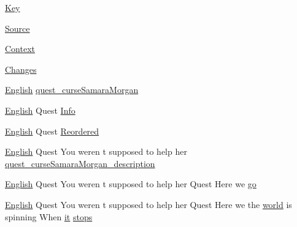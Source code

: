 \begin{DoxyCompactItemize}
\item 
\mbox{\hyperlink{_the_01_restless_01_curse_2_config_2_localization_01-_01_quest_8txt_ab3c7af4820830f9166ede9e5623c4e73}{Key}}
\item 
\mbox{\hyperlink{_the_01_restless_01_curse_2_config_2_localization_01-_01_quest_8txt_a176e1eca2d1e3d1c6a064340bc6a351e}{Source}}
\item 
\mbox{\hyperlink{_the_01_restless_01_curse_2_config_2_localization_01-_01_quest_8txt_abbebfae2c8b3c06e3115e79965277840}{Context}}
\item 
\mbox{\hyperlink{_the_01_restless_01_curse_2_config_2_localization_01-_01_quest_8txt_aada75e543d2eadaa69533d17cac8bd9a}{Changes}}
\item 
\mbox{\hyperlink{_sphere_i_i_01_winter_01_project_2_config_2_localization_8txt_ad896b63205779b1b09e86d941ce13976}{English}} \mbox{\hyperlink{_the_01_restless_01_curse_2_config_2_localization_01-_01_quest_8txt_aa5852d37d4ce0ab8ea2caa15bd175566}{quest\+\_\+curse\+Samara\+Morgan}}
\item 
\mbox{\hyperlink{_sphere_i_i_01_winter_01_project_2_config_2_localization_8txt_ad896b63205779b1b09e86d941ce13976}{English}} Quest \mbox{\hyperlink{_the_01_restless_01_curse_2_config_2_localization_01-_01_quest_8txt_abb68e52d696d925afb927a05387d9ea2}{Info}}
\item 
\mbox{\hyperlink{_sphere_i_i_01_winter_01_project_2_config_2_localization_8txt_ad896b63205779b1b09e86d941ce13976}{English}} Quest \mbox{\hyperlink{_the_01_restless_01_curse_2_config_2_localization_01-_01_quest_8txt_ad8764ed6c4f3231b4fa4631a45680a42}{Reordered}}
\item 
\mbox{\hyperlink{_sphere_i_i_01_winter_01_project_2_config_2_localization_8txt_ad896b63205779b1b09e86d941ce13976}{English}} Quest You weren t supposed to help her \mbox{\hyperlink{_the_01_restless_01_curse_2_config_2_localization_01-_01_quest_8txt_a7d6c124c385a41af5a0664c7a53e8c3c}{quest\+\_\+curse\+Samara\+Morgan\+\_\+description}}
\item 
\mbox{\hyperlink{_sphere_i_i_01_winter_01_project_2_config_2_localization_8txt_ad896b63205779b1b09e86d941ce13976}{English}} Quest You weren t supposed to help her Quest Here we \mbox{\hyperlink{_the_01_restless_01_curse_2_config_2_localization_01-_01_quest_8txt_a4c722a67215ed48eaf39d59a560b5d1c}{go}}
\item 
\mbox{\hyperlink{_sphere_i_i_01_winter_01_project_2_config_2_localization_8txt_ad896b63205779b1b09e86d941ce13976}{English}} Quest You weren t supposed to help her Quest Here we the \mbox{\hyperlink{_sphere_i_i_01_music_01_boxes_2_config_2_localization_8txt_a7ede01351426b1b7f6c1ce5f794e474f}{world}} is spinning When \mbox{\hyperlink{_the_01_restless_01_curse_2_config_2_localization_01-_01_quest_8txt_a741b285909bea4855b886664c2dcd50c}{it}} \mbox{\hyperlink{_the_01_restless_01_curse_2_config_2_localization_01-_01_quest_8txt_a0eec7642499be29cf8e94cded536eb5e}{stops}}

\end{DoxyCompactItemize}
